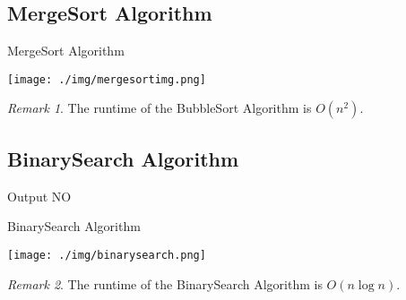 \documentclass[11pt, a4paper, oneside]{book}
\DeclarePairedDelimiter\ceil{\lceil}{\rceil}
\DeclarePairedDelimiter\floor{\lfloor}{\rfloor}
\theoremstyle{theoremdd}
\theoremstyle{remark}
\newtheorem*{remark}{Remark}
\begin{document}




\subsection*{MergeSort Algorithm}
\begin{algorithm}[H]
\SetAlgoLined
{}
 \caption{MergeSort Algorithm}
\end{algorithm}
\begin{center}
\texttt{[image: ./img/mergesortimg.png]}
\end{center}
\begin{remark}
The runtime of the BubbleSort Algorithm is $O(n^2)$.
\end{remark}

\subsection*{BinarySearch Algorithm}
\begin{algorithm}[H]
\SetAlgoLined
{}
	Output NO\;
\caption{BinarySearch Algorithm}
\end{algorithm}
\begin{center}
\texttt{[image: ./img/binarysearch.png]}
\end{center}
\begin{remark}
The runtime of the BinarySearch Algorithm is $O(n\log n)$.
\end{remark}

\pagebreak
\end{document}
